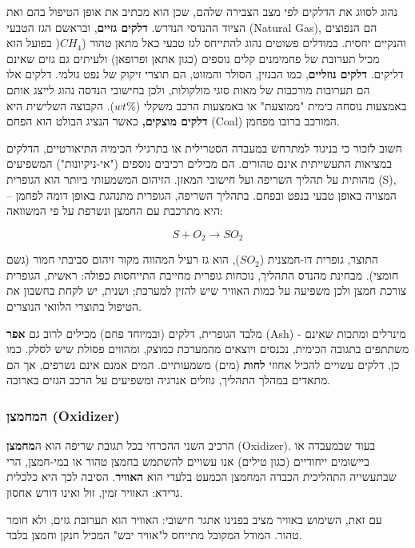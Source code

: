 \documentclass[
  hebrew,
  letterpaper,
  DIV=11,
  numbers=noendperiod]{scrreprt}
\begin{document}
נהוג לסווג את הדלקים לפי מצב הצבירה שלהם, שכן הוא מכתיב את אופן הטיפול
בהם ואת הציוד ההנדסי הנדרש. \textbf{דלקים גזיים}, ובראשם הגז הטבעי
(Natural Gas), הם הנפוצים והנקיים יחסית. במודלים פשוטים נהוג להתייחס לגז
טבעי כאל מתאן טהור (\({CH}_{4}\)( בפועל הוא מכיל תערובת של פחמימנים קלים
נוספים (כגון אתאן ופרופאן) ולעיתים גם גזים שאינם דליקים. \textbf{דלקים
נוזליים}, כמו הבנזין, הסולר והמזוט, הם תוצרי זיקוק של נפט גולמי. דלקים
אלו הם תערובות מורכבות של מאות סוגי מולקולות, ולכן בחישובי הנדסה נהוג
לייצג אותם באמצעות נוסחה כימית "ממוצעת" או באמצעות הרכב משקלי
(\(wt\%\)). הקבוצה השלישית היא \textbf{דלקים מוצקים,} כאשר הנציג הבולט
הוא הפחם (Coal) המורכב ברובו מפחמן.

חשוב לזכור כי בניגוד למתרחש במעבדה הסטרילית או בתרגילי הכימיה
התיאורטיים, הדלקים במציאות התעשייתית אינם טהורים. הם מכילים רכיבים
נוספים ("אי-ניקיונות") המשפיעים מהותית על תהליך השריפה ועל חישובי המאזן.
הזיהום המשמעותי ביותר הוא הגופרית (S), המצויה באופן טבעי בנפט ובפחם.
בתהליך השריפה, הגופרית מתנהגת באופן דומה לפחמן -- היא מתרכבת עם החמצן
ונשרפת על פי המשוואה:

\[S + O_{2} \rightarrow SO_{2}\]

התוצר, גופרית דו-חמצנית (\(SO_{2}\)), הוא גז רעיל המהווה מקור זיהום
סביבתי חמור (גשם חומצי). מבחינת מהנדס התהליך, נוכחות גופרית מחייבת
התייחסות כפולה: ראשית, הגופרית צורכת חמצן ולכן משפיעה על כמות האוויר שיש
להזין למערכת; ושנית, יש לקחת בחשבון את הטיפול בתוצרי הלוואי הנוצרים.

מלבד הגופרית, דלקים (ובמיוחד פחם) מכילים לרוב גם \textbf{אפר} (Ash) -
מינרלים ומתכות שאינם משתתפים בתגובה הכימית, נכנסים ויוצאים מהמערכת
כמוצק, ומהווים פסולת שיש לסלק. כמו כן, דלקים עשויים להכיל אחוזי
\textbf{לחות} (מים) משמעותיים. המים אמנם אינם נשרפים, אך הם מתאדים במהלך
התהליך, גוזלים אנרגיה ומשפיעים על הרכב הגזים בארובה.

\subsubsection{המחמצן
(Oxidizer)}\label{ux5d4ux5deux5d7ux5deux5e6ux5df-oxidizer}

הרכיב השני ההכרחי בכל תגובת שריפה הוא ה\textbf{מחמצן} (Oxidizer). בעוד
שבמעבדה או ביישומים ייחודיים (כגון טילים) אנו עשויים להשתמש בחמצן טהור
או במי-חמצן, הרי שבתעשייה התהליכית הכבדה המחמצן הכמעט בלעדי הוא
\textbf{האוויר}. הסיבה לכך היא כלכלית גרידא: האוויר זמין, זול ואינו דורש
אחסון.

עם זאת, השימוש באוויר מציב בפנינו אתגר חישובי: האוויר הוא תערובת גזים,
ולא חומר טהור. המודל המקובל מתייחס ל"אוויר יבש" המכיל חנקן וחמצן בלבד.
\end{document}
